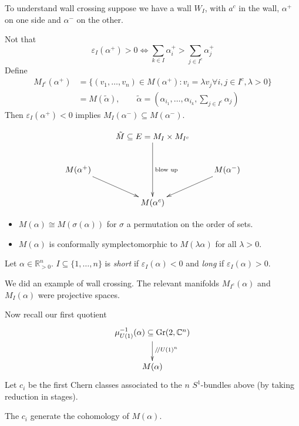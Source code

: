 To understand wall crossing suppose we have
a wall $W_I$, with $a^c$ in the wall,
$\alpha^+$ on one side and $\alpha^-$ on the
other.

Not that
$$
\varepsilon_I(\alpha^+)>0 \iff
\sum_{k \in I}\alpha_i^+>
\sum_{ j \in I^c}\alpha_j^+
$$
Define
$$
\begin{aligned}
M_{I^c}(\alpha^+)
&=\{(v_1,\ldots,v_n) \in M(\alpha^+):
v_i=\lambda v_j \forall i,j \in I^c,
\lambda>0\}\\
&=M(\tilde{\alpha}),\qquad \tilde{\alpha}=
\left(\alpha_{i_1},\ldots,\alpha_{i_k},
\sum_{j
\in I^c}\alpha_j\right)
\end{aligned}
$$
Then $\varepsilon_I(\alpha^+)<0$
implies $M_I(\alpha^-) \subseteq
M(\alpha^-)$.

$$
\xymatrix{
&\tilde{M} \subseteq E=M_I \times
M_{I^c}\ar[dd]^{\text{blow up}}\\
M(\alpha^+)\ar[dr]&  &  M(\alpha^-)\ar[dl]\\
&M(\alpha^c)
}
$$
\begin{remark}
\label{remark-modul-space-polyg-propo}
\begin{itemize}
\item $M(\alpha)\cong M(\sigma(\alpha))$
for $\sigma$ a permutation on the order of
sets.
\item $M(\alpha)$ is conformally
symplectomorphic
to $M(\lambda \alpha)$ for all $\lambda>0$.
\end{itemize}
\end{remark}

\begin{definition}
\label{definition-short-and-long}
Let $\alpha \in \mathbb{R}^n_{>0}$.
$I \subseteq \{1,\ldots,n\}$ is {\it short}
if $\varepsilon_I(\alpha)<0$ and {\it long}
if  $\varepsilon_I(\alpha)>0$.
\end{definition}

\begin{example}
\label{example-wall-crossing}
We did an example of wall crossing.
The relevant manifolds $M_{I^c}(\alpha)$ and
$M_I(\alpha)$
were projective spaces.
\end{example}

\medskip\noindent
Now recall our first quotient
$$
\xymatrix{
\mu_{U(1)}^{-1}(\alpha)\subseteq
\text{Gr}(2,\mathbb{C}^n)
\ar[d]^{/\!/U(1)^n}\\
M(\alpha)
}
$$
Let $c_i$ be the first Chern
classes associated to the
$n$ $S^1$-bundles above
(by taking reduction in stages).

\begin{theorem}
\label{theorem-Haussmann-Knutson-M}
The $c_i$ generate the cohomology of
$M(\alpha)$.
\end{theorem}

